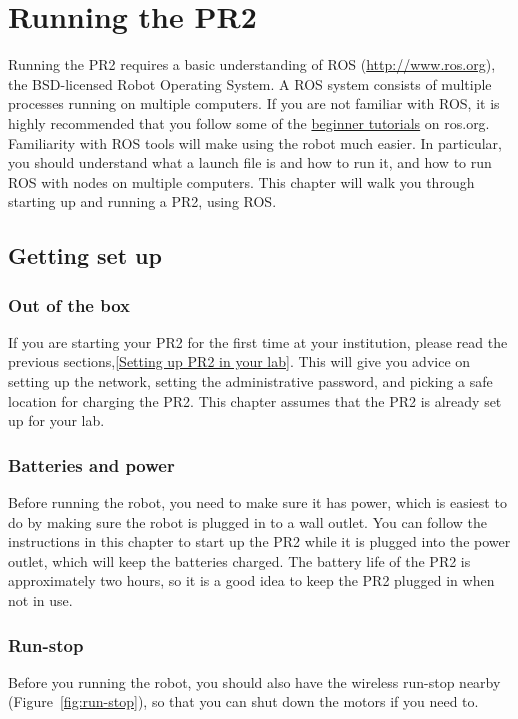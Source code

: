 \chapter{Running the PR2}
Running the PR2 requires a basic understanding of ROS (\href{http://www.ros.org}{http://www.ros.org}), the BSD-licensed 
Robot Operating System.  A ROS system consists of multiple processes running on multiple computers.  If you are not 
familiar with ROS, it is highly recommended that you follow some of the \href{http://www.ros.org/wiki/ROS/Tutorials}{beginner tutorials} 
on ros.org. Familiarity with ROS tools will make using the robot much easier.  In particular, you should understand 
what a launch file is and how to run it, and how to run ROS with nodes on multiple computers. This chapter will walk 
you through starting up and running a PR2, using ROS.

\section{Getting set up}
\subsection{Out of the box}
If you are starting your PR2 for the first time at your institution, please read the previous sections,\ref{Setting up PR2 in your lab}.  
This will give you advice on setting up the network, setting the administrative password, and picking a safe location for 
charging the PR2.  This chapter assumes that the PR2 is already set up for your lab.
\subsection{Batteries and power}
Before running the robot, you need to make sure it has power, which is easiest to do by making sure the robot is plugged in to a wall outlet. You can follow the instructions in this chapter to start up the PR2 while it is plugged into the power outlet, which will keep the batteries charged.  The battery life of the PR2 is approximately two hours, so it is a good idea to keep the PR2 plugged in when not in use.  


\subsection{Run-stop}
Before you running the robot, you should also have the wireless run-stop 
nearby (Figure~\ref{fig:run-stop}), so that you can shut down the motors if you need to. 

